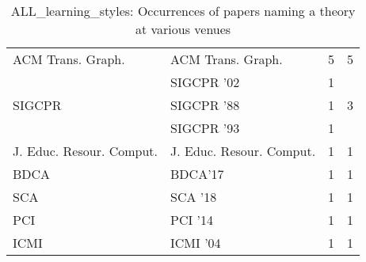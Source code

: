 \begin{table*}[t]
\begin{tabular}{llrr}
\multirow{1}{*}{ACM Trans. Graph.} & ACM Trans. Graph. & 5 & \multirow{1}{*}{5}\\
\multirow{3}{*}{SIGCPR } & SIGCPR '02 & 1 & \multirow{3}{*}{3}\\
& SIGCPR '88 & 1 &\\
& SIGCPR '93 & 1 &\\
\multirow{1}{*}{J. Educ. Resour. Comput.} & J. Educ. Resour. Comput. & 1 & \multirow{1}{*}{1}\\
\multirow{1}{*}{BDCA} & BDCA'17 & 1 & \multirow{1}{*}{1}\\
\multirow{1}{*}{SCA } & SCA '18 & 1 & \multirow{1}{*}{1}\\
\multirow{1}{*}{PCI } & PCI '14 & 1 & \multirow{1}{*}{1}\\
\multirow{1}{*}{ICMI } & ICMI '04 & 1 & \multirow{1}{*}{1}\\
\end{tabular}
\caption{ALL\_learning\_styles: Occurrences of papers naming a theory at various venues}
\end{table*}